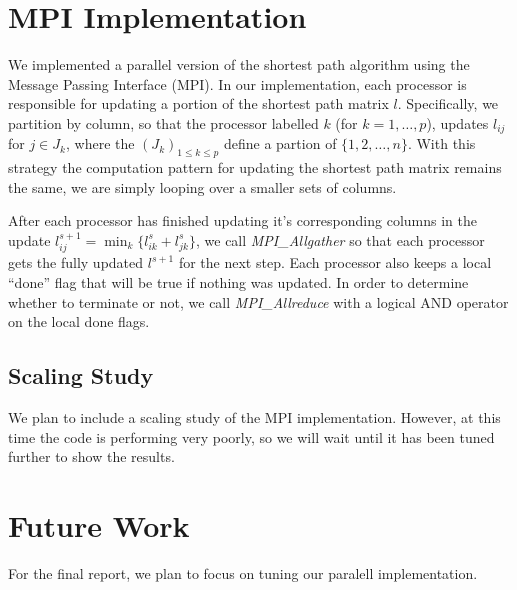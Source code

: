 \documentclass[11pt]{article}
\begin{document}
\section*{MPI Implementation}

We implemented a parallel version of the shortest path algorithm using the
Message Passing Interface (MPI).
In our implementation, each processor is responsible for updating a portion of 
the shortest path matrix $l$.  Specifically, we partition by column, so that 
the processor labelled $k$ (for $k = 1, \ldots, p$), updates $l_{ij}$ for 
$j \in J_k$, where the $(J_k)_{1 \leq k \leq p}$ define a partion of 
$\{1, 2, \ldots, n\}$.
With this strategy the computation pattern for updating the shortest path matrix
remains the same, we are simply looping over a smaller sets of columns.

After each processor has finished updating it's corresponding columns in
the update $l_{ij}^{s+1} = \min_k \{ l^s_{ik} + l^s_{jk} \}$, we call
\emph{MPI\_Allgather} so that each processor gets the fully updated $l^{s+1}$
for the next step.  Each processor also keeps a local ``done'' flag that will
be true if nothing was updated.  In order to determine whether to terminate
or not, we call \emph{MPI\_Allreduce} with a logical AND operator on the local
done flags.

\subsection*{Scaling Study}

We plan to include a scaling study of the MPI implementation.  However, at this time the 
code is performing very poorly, so we will wait until it has been tuned further to show 
the results.

\section*{Future Work}

For the final report, we plan to focus on tuning our paralell implementation.
\end{document}
